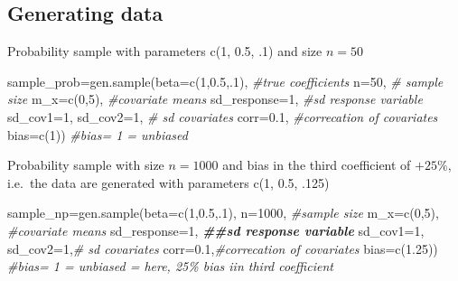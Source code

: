 \documentclass[
]{article}
\newenvironment{Shaded}{\begin{snugshade}}{\end{snugshade}}
\newcommand{\AttributeTok}[1]{\textcolor[rgb]{0.77,0.63,0.00}{#1}}
\newcommand{\CommentTok}[1]{\textcolor[rgb]{0.56,0.35,0.01}{\textit{#1}}}
\newcommand{\DecValTok}[1]{\textcolor[rgb]{0.00,0.00,0.81}{#1}}
\newcommand{\DocumentationTok}[1]{\textcolor[rgb]{0.56,0.35,0.01}{\textbf{\textit{#1}}}}
\newcommand{\FloatTok}[1]{\textcolor[rgb]{0.00,0.00,0.81}{#1}}
\newcommand{\FunctionTok}[1]{\textcolor[rgb]{0.00,0.00,0.00}{#1}}
\newcommand{\NormalTok}[1]{#1}
\newcommand{\OtherTok}[1]{\textcolor[rgb]{0.56,0.35,0.01}{#1}}
\begin{document}
\hypertarget{generating-data}{%
\subsection{Generating data}\label{generating-data}}

Probability sample with parameters c(1, 0.5, .1) and size \(n=50\)

\begin{Shaded}
\begin{Highlighting}[]
\NormalTok{sample\_prob}\OtherTok{=}\FunctionTok{gen.sample}\NormalTok{(}\AttributeTok{beta=}\FunctionTok{c}\NormalTok{(}\DecValTok{1}\NormalTok{,}\FloatTok{0.5}\NormalTok{,.}\DecValTok{1}\NormalTok{), }\CommentTok{\#true coefficients}
                       \AttributeTok{n=}\DecValTok{50}\NormalTok{, }\CommentTok{\# sample size}
                       \AttributeTok{m\_x=}\FunctionTok{c}\NormalTok{(}\DecValTok{0}\NormalTok{,}\DecValTok{5}\NormalTok{), }\CommentTok{\#covariate means}
                       \AttributeTok{sd\_response=}\DecValTok{1}\NormalTok{, }\CommentTok{\#sd response variable}
                       \AttributeTok{sd\_cov1=}\DecValTok{1}\NormalTok{, }\AttributeTok{sd\_cov2=}\DecValTok{1}\NormalTok{, }\CommentTok{\# sd covariates}
                       \AttributeTok{corr=}\FloatTok{0.1}\NormalTok{, }\CommentTok{\#correcation of covariates}
                       \AttributeTok{bias=}\FunctionTok{c}\NormalTok{(}\DecValTok{1}\NormalTok{)) }\CommentTok{\#bias= 1 = unbiased}
\end{Highlighting}
\end{Shaded}

Probability sample with size \(n=1000\) and bias in the third
coefficient of \(+25\%\), i.e.~the data are generated with parameters
c(1, 0.5, .125)

\begin{Shaded}
\begin{Highlighting}[]
\NormalTok{sample\_np}\OtherTok{=}\FunctionTok{gen.sample}\NormalTok{(}\AttributeTok{beta=}\FunctionTok{c}\NormalTok{(}\DecValTok{1}\NormalTok{,}\FloatTok{0.5}\NormalTok{,.}\DecValTok{1}\NormalTok{), }
                     \AttributeTok{n=}\DecValTok{1000}\NormalTok{, }\CommentTok{\#sample size}
                     \AttributeTok{m\_x=}\FunctionTok{c}\NormalTok{(}\DecValTok{0}\NormalTok{,}\DecValTok{5}\NormalTok{), }\CommentTok{\#covariate means}
                     \AttributeTok{sd\_response=}\DecValTok{1}\NormalTok{, }\DocumentationTok{\#\#sd response variable}
                     \AttributeTok{sd\_cov1=}\DecValTok{1}\NormalTok{, }\AttributeTok{sd\_cov2=}\DecValTok{1}\NormalTok{,}\CommentTok{\# sd covariates}
                     \AttributeTok{corr=}\FloatTok{0.1}\NormalTok{,}\CommentTok{\#correcation of covariates}
                     \AttributeTok{bias=}\FunctionTok{c}\NormalTok{(}\FloatTok{1.25}\NormalTok{)) }\CommentTok{\#bias= 1 = unbiased = here, 25\% bias iin third coefficient}
\end{Highlighting}
\end{Shaded}
\end{document}
